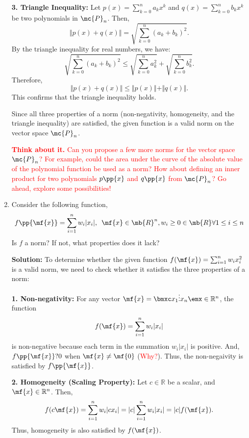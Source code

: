 \begin{enumerate}
\begin{boxedstuff}
        \textbf{3. Triangle Inequality:} 
        Let $p(x) = \sum_{k=0}^n a_k x^k$ and $q(x) = \sum_{k=0}^n b_k x^k$ be two polynomials in $\mc{P}_n$. Then,
        \[
        \Vert p(x) + q(x) \Vert = \sqrt{\sum_{k=0}^{n} (a_k + b_k)^2}.
        \]
        By the triangle inequality for real numbers, we have:
        \[
        \sqrt{\sum_{k=0}^{n} (a_k + b_k)^2} \leq \sqrt{\sum_{k=0}^{n} a_k^2} + \sqrt{\sum_{k=0}^{n} b_k^2}.
        \]
        Therefore, 
        \[
        \Vert p(x) + q(x) \Vert \leq \Vert p(x) \Vert + \Vert q(x) \Vert.
        \]
        This confirms that the triangle inequality holds.

        Since all three properties of a norm (non-negativity, homogeneity, and the triangle inequality) are satisfied, the given function is a valid norm on the vector space $\mc{P}_n$.

        \textcolor{red}{\textbf{Think about it.} Can you propose a few more norms for the vector space $\mc{P}_n$? For example, could the area under the curve of the absolute value of the polynomial function be used as a norm? How about defining an inner product for two polynomials $p\pp{x}$ and $q\pp{x}$ from $\mc{P}_n$? Go ahead, explore some possibilities!}
    \end{boxedstuff}

    \item Consider the following function,
    \[ f\pp{\mf{x}} = \sum_{i=1}^n w_i \vert x_i \vert, \,\,\, \mf{x} \in \mb{R}^n, w_i \geq 0 \in \mb{R} \forall 1 \leq i \leq n \]
    Is $f$ a norm? If not, what properties does it lack?
    
    \begin{boxedstuff}
        \vspace{4mm}
        \textbf{Solution:} To determine whether the given function $f(\mf{x}) = \sum_{i=1}^n w_i x_i^2$ is a valid norm, we need to check whether it satisfies the three properties of a norm:

        \textbf{1. Non-negativity:} 
        For any vector $\mf{x} = \bmxc x_1 \\ \vdots \\ x_n \emx \in \mathbb{R}^n$, the function
        \[
        f(\mf{x}) = \sum_{i=1}^n w_i \vert x_i \vert
        \]
        is non-negative because each term in the summation $w_i \vert x_i \vert$ is positive. And, $f\pp{\mf{x}} ? 0$ when $\mf{x} \neq \mf{0}$ (\textcolor{red}{Why?}). Thus, the non-negaivity is satisfied by $f\pp{\mf{x}}$.

        \textbf{2. Homogeneity (Scaling Property):} 
        Let $c \in \mathbb{R}$ be a scalar, and $\mf{x} \in \mathbb{R}^n$. Then,
        \[
        f(c \mf{x}) = \sum_{i=1}^n w_i \vert c x_i \vert = \vert c \vert \sum_{i=1}^n w_i \vert x_i \vert = \vert c \vert f(\mf{x}).
        \]
        Thus, homogeneity is also satisfied by $f(\mf{x})$.


\end{boxedstuff}
\end{enumerate}
